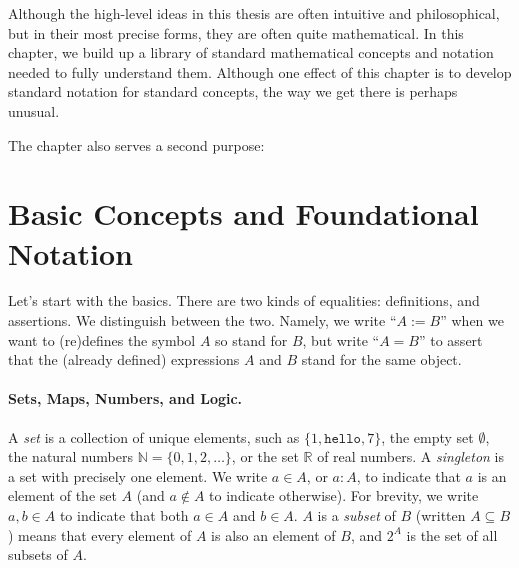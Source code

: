     \label{chap:prelim}

Although the high-level ideas in this thesis are often intuitive and philosophical, 
but in their most precise forms, they are often quite mathematical.
In this chapter, we build up a library of standard mathematical concepts and notation needed to fully understand them. 
Although one effect of this chapter is to develop standard notation for standard concepts, 
    the way we get there is perhaps unusual. 

 
The chapter also serves a second purpose: 
    

\section{Basic Concepts and Foundational Notation}

Let's start with the basics.
There are two kinds of equalities: definitions, and assertions. 
We distinguish between the two.
Namely, we write ``$A := B$'' when we want to (re)defines the symbol $A$ so stand for $B$,
but write ``$A = B$'' to assert that the (already defined) expressions $A$ and $B$ stand for the same object.

    \label{ref:prelim-basic}

\paragraph{Sets, Maps, Numbers, and Logic.}
A \emph{set} is a collection of unique elements, 
    such as 
    $\{1, \texttt{hello}, 7\}$,
    the empty set $\emptyset$, 
    the natural numbers $\mathbb N = \{0, 1, 2, \ldots \}$,
    or the set $\mathbb R$ of real numbers. 
A \emph{singleton} is a set with precisely one element. 
We write $a \in A$, or $a : A$, 
    to indicate that $a$ is an element of the set $A$
    (and $a \notin A$ to indicate otherwise).
For brevity, we write $a,b \in A$ to indicate that both $a \in A$ and $b \in A$. 
$A$ is a \emph{subset} of $B$ (written $A \subseteq B$) means that every element of $A$ is also an element of $B$, and $2^A$ is the set of all subsets of $A$.

